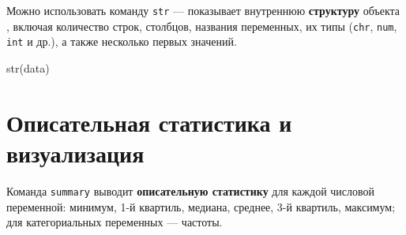 \documentclass[
  letterpaper,
  DIV=11,
  numbers=noendperiod]{scrreprt}
\newenvironment{Shaded}{\begin{snugshade}}{\end{snugshade}}
\newcommand{\DecValTok}[1]{\textcolor[rgb]{0.68,0.00,0.00}{#1}}
\newcommand{\ErrorTok}[1]{\textcolor[rgb]{0.68,0.00,0.00}{#1}}
\newcommand{\FloatTok}[1]{\textcolor[rgb]{0.68,0.00,0.00}{#1}}
\newcommand{\FunctionTok}[1]{\textcolor[rgb]{0.28,0.35,0.67}{#1}}
\newcommand{\NormalTok}[1]{\textcolor[rgb]{0.00,0.23,0.31}{#1}}
\newcommand{\SpecialCharTok}[1]{\textcolor[rgb]{0.37,0.37,0.37}{#1}}
\newcommand{\StringTok}[1]{\textcolor[rgb]{0.13,0.47,0.30}{#1}}
\begin{document}
Можно использовать команду \texttt{str} --- показывает внутреннюю
\textbf{структуру} объекта , включая количество строк, столбцов,
названия переменных, их типы (\texttt{chr}, \texttt{num}, \texttt{int} и
др.), а также несколько первых значений.

\begin{Shaded}
\begin{Highlighting}[]
\FunctionTok{str}\NormalTok{(data)}
\end{Highlighting}
\end{Shaded}

\begin{Shaded}
\end{Shaded}

\section{Описательная статистика и
визуализация}\label{ux43eux43fux438ux441ux430ux442ux435ux43bux44cux43dux430ux44f-ux441ux442ux430ux442ux438ux441ux442ux438ux43aux430-ux438-ux432ux438ux437ux443ux430ux43bux438ux437ux430ux446ux438ux44f}

Команда \texttt{summary} выводит \textbf{описательную статистику} для
каждой числовой переменной: минимум, 1-й квартиль, медиана, среднее, 3-й
квартиль, максимум; для категориальных переменных --- частоты.
\end{document}
